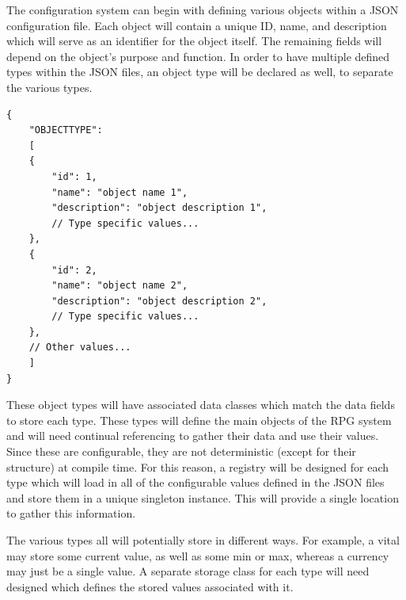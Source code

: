 The configuration system can begin with defining various objects within a JSON configuration file. Each object will contain a unique ID, name, and description which will serve as an identifier for the object itself. The remaining fields will depend on the object's purpose and function. In order to have multiple defined types within the JSON files, an object type will be declared as well, to separate the various types. 
\begin{lstlisting}[style=htmlstyle]
{
	"OBJECTTYPE": 
	[
	{
		"id": 1,
		"name": "object name 1",
		"description": "object description 1",
		// Type specific values...
	},
	{
		"id": 2,
		"name": "object name 2",
		"description": "object description 2",
		// Type specific values...
	},
	// Other values...
	]
}
\end{lstlisting}
These object types will have associated data classes which match the data fields to store each type. These types will define the main objects of the RPG system and will need continual referencing to gather their data and use their values. Since these are configurable, they are not deterministic (except for their structure) at compile time. For this reason, a registry will be designed for each type which will load in all of the configurable values defined in the JSON files and store them in a unique singleton instance. This will provide a single location to gather this information.

The various types all will potentially store in different ways. For example, a vital may store some current value, as well as some min or max, whereas a currency may just be a single value. A separate storage class for each type will need designed which defines the stored values associated with it.














